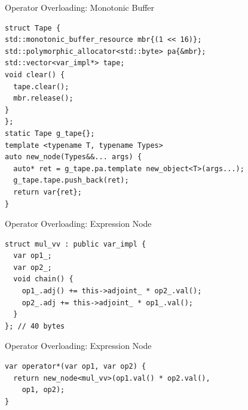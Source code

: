 \documentclass[dvipsnames]{beamer}
\newenvironment{CacheLine}[1][]{
  \begin{tikzpicture}[x=1.2cm,y=0.8cm,font=\footnotesize,>=Stealth,#1]
    \def\CacheH{1.0}   %
    \def\CacheBelow{1.0} %

}{
    \foreach \i in {1,...,7} { \draw[black!40] (\i,0) -- (\i,\CacheH); }
    \draw[line width=0.6pt, rounded corners=2pt] (0,0) rectangle (8,\CacheH);
    \foreach \i in {0,...,7} {
      \node[below=3pt, text=black!75] at (\i+0.5,0) {8B \i};
    }
  \end{tikzpicture}
}
\newcommand{\CacheColor}[2]{%
  \fill[#2, fill opacity=0.35, draw=none] (#1,0) rectangle ++(1,\CacheH);%
}
\newcommand{\CacheMarkBelow}[3][green!60!black]{%
  \draw[-{Stealth[length=3mm]}, very thick, draw=#1] (#2,-\CacheBelow+0.28) -- (#2,0.02);
  \node[below, anchor=west, text=#1] at (#2,-\CacheBelow-0.2) {#3};
}
\newcommand{\CacheSetBelow}[1]{\def\CacheBelow{#1}}
\begin{document}
\begin{frame}[fragile]{Operator Overloading: Monotonic Buffer}
\begin{verbatim}
struct Tape {
std::monotonic_buffer_resource mbr{(1 << 16)};
std::polymorphic_allocator<std::byte> pa{&mbr};
std::vector<var_impl*> tape;
void clear() {
  tape.clear();
  mbr.release();
}
};
static Tape g_tape{};
template <typename T, typename Types>
auto new_node(Types&&... args) {
  auto* ret = g_tape.pa.template new_object<T>(args...);
  g_tape.tape.push_back(ret);
  return var{ret};
}
\end{verbatim}
\end{frame}

\begin{frame}[fragile]{Operator Overloading: Expression Node}
\begin{verbatim}
struct mul_vv : public var_impl {
  var op1_;
  var op2_;
  void chain() {
    op1_.adj() += this->adjoint_ * op2_.val();
    op2_.adj += this->adjoint_ * op1_.val();
  }
}; // 40 bytes
\end{verbatim}
\end{frame}

\begin{frame}[fragile]{Operator Overloading: Expression Node}
\begin{verbatim}
var operator*(var op1, var op2) {
  return new_node<mul_vv>(op1.val() * op2.val(),
    op1, op2);
}
\end{verbatim}
\end{frame}
\end{document}
